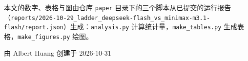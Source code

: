 \documentclass[11pt,a4paper,fontset=none]{ctexart}
\begin{document}
本文的数字、表格与图由仓库 \texttt{paper} 目录下的三个脚本从已提交的运行报告（\nolinkurl{reports/2026-10-29_ladder_deepseek-flash_vs_minimax-m3.1-flash/report.json}）生成：\texttt{analysis.py} 计算统计量，\texttt{make\_tables.py} 生成表格，\texttt{make\_figures.py} 绘图。

\vspace{2em}\begin{flushright}由 Albert Huang 创建于 2026-10-31\end{flushright}
\end{document}
